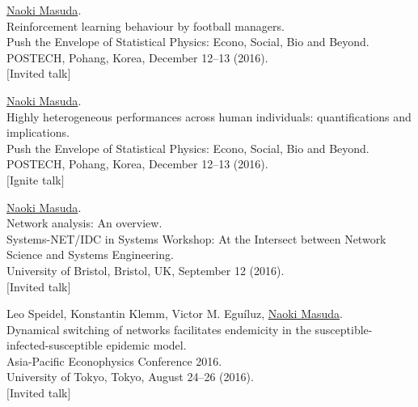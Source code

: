 \documentclass[11pt,letter]{article}
\begin{document}
\begin{etaremune}
\item \underline{Naoki Masuda}.\\
Reinforcement learning behaviour by football managers.\\
Push the Envelope of Statistical Physics: Econo, Social, Bio and Beyond.\\
POSTECH, Pohang, Korea, December 12--13 (2016).\\
$[$Invited talk$]$

\item \underline{Naoki Masuda}.\\
Highly heterogeneous performances across human individuals: quantifications and implications.\\
Push the Envelope of Statistical Physics: Econo, Social, Bio and Beyond.\\
POSTECH, Pohang, Korea, December 12--13 (2016).\\
$[$Ignite talk$]$

\item \underline{Naoki Masuda}.\\
Network analysis: An overview.\\
Systems-NET/IDC in Systems Workshop: At the Intersect between Network Science and Systems Engineering.\\
University of Bristol, Bristol, UK, September 12 (2016).\\
$[$Invited talk$]$

\item Leo Speidel, Konstantin Klemm, Victor M. Egu\'{i}luz, \underline{Naoki Masuda}.\\
Dynamical switching of networks facilitates endemicity in the susceptible-infected-susceptible epidemic model.\\
Asia-Pacific Econophysics Conference 2016.\\
University of Tokyo, Tokyo, August 24--26 (2016).\\
$[$Invited talk$]$




\end{etaremune}
\end{document}
